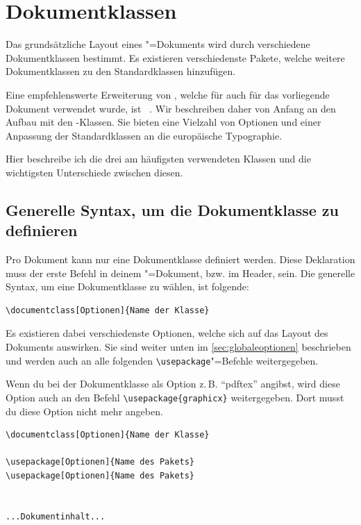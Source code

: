 %
%

\chapter{Dokumentklassen}
\label{sec:dokumentklassen}

Das grundsätzliche Layout eines \DMLLaTeX"=Dokuments wird durch verschiedene Dokumentklassen bestimmt. Es existieren verschiedenste Pakete, welche weitere Dokumentklassen zu den Standardklassen hinzufügen.

Eine empfehlenswerte Erweiterung von \DMLLaTeX, welche für auch für das vorliegende Dokument verwendet wurde, ist \KOMAScript~\cite{KOMA}. Wir beschreiben daher von Anfang an den Aufbau mit den \KOMAScript-Klassen. Sie bieten eine Vielzahl von Optionen und einer Anpassung der Standardklassen an die europäische Typographie.

Hier beschreibe ich die drei am häufigsten verwendeten Klassen und die wichtigsten Unterschiede zwischen diesen.

\section{Generelle Syntax, um die Dokumentklasse zu definieren}

Pro Dokument kann nur eine Dokumentklasse definiert werden. Diese Deklaration muss der erste Befehl in deinem \DMLLaTeX"=Dokument, bzw. im Header, sein. Die generelle Syntax, um eine Dokumentklasse zu wählen, ist folgende:
\begin{lstlisting}
\documentclass[Optionen]{Name der Klasse}
\end{lstlisting}

Es existieren dabei verschiedenste Optionen, welche sich auf das Layout des Dokuments auswirken. Sie sind weiter unten im \cref{sec:globaleoptionen} beschrieben und werden auch an alle folgenden \texttt{\textbackslash usepackage}"=Befehle weitergegeben. 

Wenn du bei der Dokumentklasse als Option z.\,B. \enquote{pdftex} angibst, wird diese Option auch an den Befehl \texttt{\textbackslash usepackage\{graphicx\}} weitergegeben. Dort musst du diese Option nicht mehr angeben.
\begin{lstlisting}
\documentclass[Optionen]{Name der Klasse}

\usepackage[Optionen]{Name des Pakets}
\usepackage[Optionen]{Name des Pakets}


...Dokumentinhalt...

\end{lstlisting}

